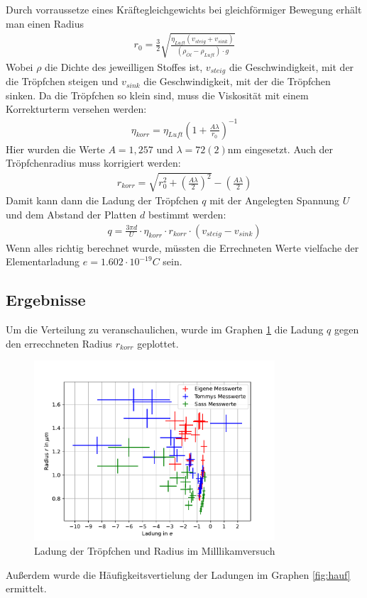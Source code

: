 \documentclass[11pt, a4paper]{article}
\begin{document}
    Durch vorraussetze eines Kräftegleichgewichts bei gleichförmiger Bewegung erhält man einen Radius
    \begin{align}
        r_0 = \frac{3}{2} \sqrt{\frac{\eta_{Luft} (v_{steig} + v_{sink})}{(\rho_{\ddot{Ol}} - \rho_{Luft}) \cdot g}}%
    \end{align}
    Wobei $\rho$ die Dichte des jeweilligen Stoffes ist, $v_{steig}$ die Geschwindigkeit, mit der die Tröpfchen steigen und $v_{sink}$ die Geschwindigkeit, mit der die Tröpfchen sinken. Da die Tröpfchen so klein sind, muss die Viskosität mit einem Korrekturterm versehen werden:
    \begin{align}
        \eta_{korr} = \eta_{Luft}\left(1+\frac{A \lambda}{r_0}\right)^{-1}
    \end{align}
    Hier wurden die Werte $A = 1,257$ und $\lambda = 72(2) \si{\nano\metre}$ eingesetzt.
    Auch der Tröpfchenradius muss korrigiert werden:
    \begin{align}
        r_{korr} = \sqrt{r_0^2 + \left(\frac{A \lambda}{2}\right)^2} - \left(\frac{A \lambda}{2}\right)
    \end{align}
    Damit kann dann die Ladung der Tröpfchen $q$ mit der Angelegten Spannung $U$ und dem Abstand der Platten $d$ bestimmt werden:
    \begin{align}
        q = \frac{3 \pi d}{U} \cdot \eta_{korr} \cdot r_{korr} \cdot \left(v_{steig} - v_{sink}\right)
    \end{align}
    Wenn alles richtig berechnet wurde, müssten die Errechneten Werte vielfache der Elementarladung $e = 1.602 \cdot 10^{-19} \si{C}$ sein.

    \subsection{Ergebnisse}
    Um die Verteilung zu veranschaulichen, wurde im Graphen \ref{fig:milllikam} die Ladung $q$ gegen den errecchneten Radius $r_{korr}$ geplottet.
    \begin{figure}[h]
        \centering
        \includegraphics[width=0.8\textwidth]{millikan.pdf}
        \caption{Ladung der Tröpfchen und Radius im Milllikamversuch}
        \label{fig:milllikam}
    \end{figure}
    Außerdem wurde die Häufigkeitsvertielung der Ladungen im Graphen \ref{fig:hauf} ermittelt.
    
\end{document}
